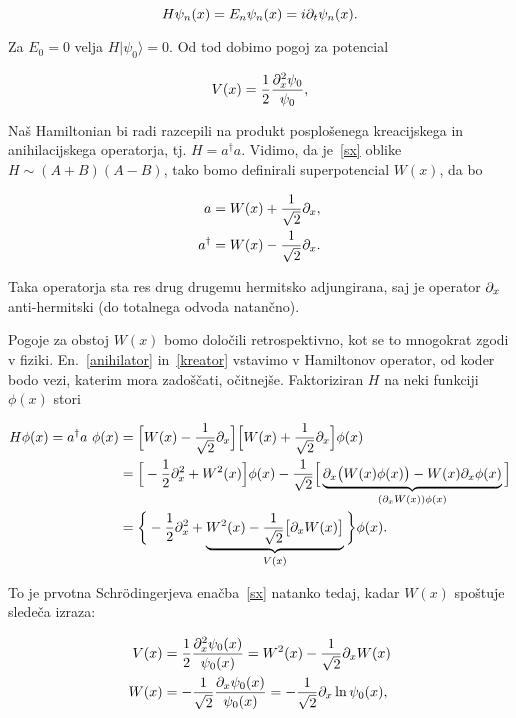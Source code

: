 \begin{equation}
	H\psi_n(x) = E_n\psi_n(x) = i\partial_t\psi_n(x).
\end{equation}

\ni Za $E_0 = 0$ velja $H|\psi_0\rangle = 0$. Od tod dobimo pogoj za potencial

\begin{equation}
	V(x) = \frac{1}{2}\frac{\partial_x^2\psi_0}{\psi_0},
	\label{vpogoj}
\end{equation}

Na\v s Hamiltonian bi radi razcepili na produkt posplo\v senega kreacijskega in anihilacijskega operatorja, tj.
$H = a^\dagger a$. Vidimo, da je~\eqref{sx} oblike
$H \sim (A + B)(A - B)$, tako bomo definirali superpotencial $W(x)$, da bo

\begin{align}
	a &= W(x) + \frac{1}{\sqrt{2}}\partial_x,          \label{anihilator} \\
	a^\dagger &= W(x) - \frac{1}{\sqrt{2}}\partial_x.  \label{kreator}
\end{align}

\ni Taka operatorja sta res drug drugemu hermitsko adjungirana, saj je operator $\partial_x$ anti-hermitski (do totalnega
odvoda natan\v cno).

Pogoje za obstoj $W(x)$ bomo dolo\v cili retrospektivno, kot se to mnogokrat zgodi v fiziki.
En.~\eqref{anihilator} in~\eqref{kreator} vstavimo v Hamiltonov operator, od koder bodo vezi,
katerim mora zado\v s\v cati, o\v citnej\v se. Faktoriziran $H$ na neki funkciji $\phi (x)$ stori

\begin{align}
	H\phi(x) = a^\dagger a\ \phi(x)&= \Big[W(x) - \frac{1}{\sqrt{2}}\partial_x\Big]\Big[W(x) +
		\frac{1}{\sqrt{2}}\partial_x\Big]\phi(x) \notag \\
	&= \Big[-\frac{1}{2}\partial_x^2 + W^2(x)\Big]\phi(x) - \frac{1}{\sqrt{2}}\Big[
		\underbrace{\partial_x \big(W(x)\phi(x)\big) - W(x)\partial_x\phi(x)}_{(\partial_x W(x))\phi(x)} \Big] \notag \\
	&= \bigg\{-\frac{1}{2}\partial_x^2 +
		\underbrace{W^2(x) - \frac{1}{\sqrt{2}}\big[\partial_x W(x)\big]}_{V(x)}\bigg\}\phi(x).
	\label{dokaz.aad}
\end{align}

\ni To je prvotna Schr\" odingerjeva ena\v cba~\eqref{sx} natanko tedaj, kadar $W (x)$ spo\v stuje slede\v ca izraza:

\begin{align}
	V(x) &=\frac{1}{2}\frac{\partial_x^2\psi_0(x)}{\psi_0(x)} = W^2(x) - \frac{1}{\sqrt{2}}\partial_x
		W(x) \label{riccati} \\
	W(x) &= -\frac{1}{\sqrt{2}}\frac{\partial_x\psi_0(x)}{\psi_0(x)} = -\frac{1}{\sqrt{2}} \partial_x \ln \psi_0 (x)\label{superpotencial},
\end{align}


